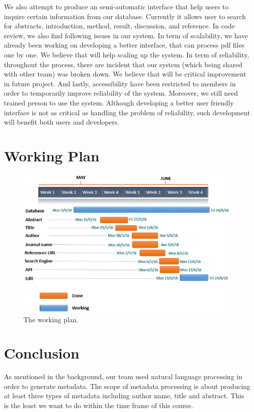 	We also attempt to produce an semi-automatic interface that help users to inquire certain information from our database. 
	Currently it allows user to search for abstracts, introduction, method, result, discussion, and reference. 
	In code review, we also find following issues in our system.
	In term of scalability, we have already been working on developing a better interface, that can process pdf files one by one. 
	We believe that will help scaling up the system.
	In term of reliability, throughout the process, there are incident that our system (which being shared with other team) was broken down. 
	We believe that will be critical improvement in future project.
	And lastly, accessibility have been restricted to members in order to temporarily improve reliability of the system. 
	Moreover, we still need trained person to use the system.
	Although developing a better user friendly interface is not as critical as handling the problem of reliability, such development will benefit both users and developers.
	
	
\section*{Working Plan}

\begin{figure}[tbh]
	\begin{center}
		\includegraphics[width=\columnwidth]{Union_Result_Chart_working plan}
	\end{center}
	\caption{The working plan.}
	\end{figure}
	
\section*{Conclusion}
As mentioned in the background, our team used natural language processing in order to generate metadata. 
The scope of metadata processing is about producing at least three types of metadata including author name, title and abstract. 
This is the least we want to do within the time frame of this course. 

